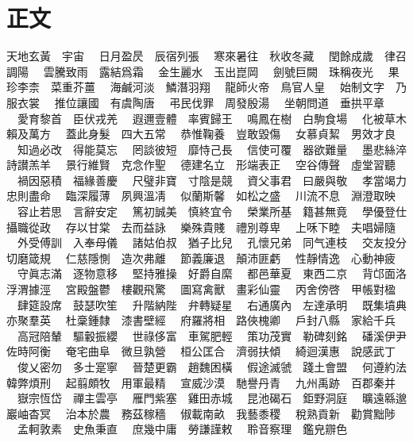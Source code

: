 \documentclass[紅,便箋]{genkou}
\subtitle{千字文}
\author{南朝\CID{119}梁\CID{119}周興嗣}
\begin{document}
\maketitle

\tableofcontents 


\chapter{正文}

\pagestyle{headnombre}

\ukai \LARGE\par\noindent

天地玄黃　宇宙
　日月盈昃　辰宿列張
　寒來暑往　秋收冬藏
　閏餘成歲　律召調陽　
%
雲騰致雨　露結爲霜
　金生麗水　玉出崑岡
　劍號巨闕　珠稱夜光
　果珍李柰　菜重芥薑
　海鹹河淡　鱗潛羽翔
　龍師火帝　鳥官人皇
　始制文字　乃服衣裳
　推位讓國　有虞陶唐
　弔民伐罪　周發殷湯
　坐朝問道　垂拱平章
　愛育黎首　臣伏戎羌
　遐邇壹體　率賓歸王
　鳴鳳在樹　白駒食場
　化被草木　賴及萬方
　蓋此身髮　四大五常
　恭惟鞠養　豈敢毀傷
　女慕貞絜　男效才良
　知過必改　得能莫忘
　罔談彼短　靡恃己長
　信使可覆　器欲難量
　墨悲絲淬　詩讃羔羊
　景行維賢　克念作聖
　德建名立　形端表正
　空谷傳聲　虛堂習聽
　禍因惡積　福緣善慶
　尺璧非寶　寸陰是競
　資父事君　曰嚴與敬
　孝當竭力　忠則盡命
　臨深履薄　夙興溫凊
　似蘭斯馨　如松之盛
　川流不息　淵澄取映
　容止若思　言辭安定
　篤初誠美　慎終宜令
　榮業所基　籍甚無竟
　學優登仕　攝職從政
　存以甘棠　去而益詠
　樂殊貴賤　禮別尊卑
　上咊下睦　夫唱婦隨
　外受傅訓　入奉母儀
　諸姑伯叔　猶子比兒
　孔懷兄弟　同气連枝
　交友投分　切磨箴規
　仁慈隱惻　造次弗離
　節義廉退　顛沛匪虧
　性靜情逸　心動神疲
　守眞志滿　逐物意移
　堅持雅操　好爵自縻
　都邑華夏　東西二京
　背邙面洛　浮渭據涇
　宮殿盤鬱　樓觀飛驚
　圖寫禽獸　畫彩仙靈
　丙舍傍啓　甲帳對楹%
　肆筵設席　鼓瑟吹笙
　升階納陛　弁轉疑星
　右通廣內　左達承明
　既集墳典　亦聚羣英
　杜稾鍾隸　漆書壁經
　府羅將相　路俠槐卿
　戶封八縣　家給千兵
　高冠陪輦　驅轂振纓
　世祿侈富　車駕肥輕
　策功茂實　勒碑刻銘
　磻溪伊尹　佐時阿衡
　奄宅曲阜　微旦孰營
　桓公匡合　濟弱扶傾
　綺迴漢惠　說感武丁
　俊乂密勿　多士寔寧
　晉楚更霸　趙魏困橫
　假途滅虢　踐土會盟
　何遵約法　韓弊煩刑
　起翦頗牧　用軍最精
　宣威沙漠　馳譽丹青
　九州禹跡　百郡秦并
　嶽宗恆岱　禪主雲亭
　雁門紫塞　雞田赤城
　昆池碣石　鉅野洞庭
　曠遠緜邈　巖岫杳冥
　治本於農　務茲稼穡
　俶載南畝　我藝黍稷
　稅熟貢新　勸賞黜陟
　孟軻敦素　史魚秉直
　庶幾中庸　勞謙謹敕
　聆音察理　鑑皃辧色
\end{document}
